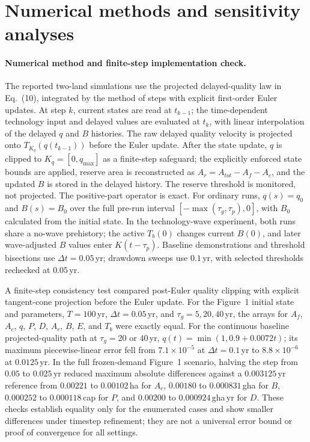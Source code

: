 \documentclass[11pt,a4paper]{article}
\begin{document}
\section{Numerical methods and sensitivity analyses}\label{si:numerics}

\paragraph{Numerical method and finite-step implementation check.} The reported two-land simulations use the projected delayed-quality law in Eq.~(10), integrated by the method of steps with explicit first-order Euler updates. At step $k$, current states are read at $t_{k-1}$; the time-dependent technology input and delayed values are evaluated at $t_k$, with linear interpolation of the delayed $q$ and $B$ histories. The raw delayed quality velocity is projected onto $T_{K_q}(q(t_{k-1}))$ before the Euler update. After the state update, $q$ is clipped to $K_q=[0,q_{\max}]$ as a finite-step safeguard; the explicitly enforced state bounds are applied, reserve area is reconstructed as $A_r=A_{tot}-A_f-A_c$, and the updated $B$ is stored in the delayed history. The reserve threshold is monitored, not projected. The positive-part operator is exact. For ordinary runs, $q(s)=q_0$ and $B(s)=B_0$ over the full pre-run interval $[-\max(\tau_g,\tau_p),0]$, with $B_0$ calculated from the initial state. In the technology-wave experiment, both runs share a no-wave prehistory; the active $T_b(0)$ changes current $B(0)$, and later wave-adjusted $B$ values enter $K(t-\tau_p)$. Baseline demonstrations and threshold bisections use $\Delta t=0.05$\,yr; drawdown sweeps use $0.1$\,yr, with selected thresholds rechecked at $0.05$\,yr.

A finite-step consistency test compared post-Euler quality clipping with explicit tangent-cone projection before the Euler update. For the Figure~1 initial state and parameters, $T=100$\,yr, $\Delta t=0.05$\,yr, and $\tau_g=5,20,40$\,yr, the arrays for $A_f$, $A_c$, $q$, $P$, $D$, $A_r$, $B$, $E$, and $T_b$ were exactly equal. For the continuous baseline projected-quality path at $\tau_g=20$ or $40$\,yr, $q(t)=\min(1,0.9+0.0072t)$; its maximum piecewise-linear error fell from $7.1\times10^{-5}$ at $\Delta t=0.1$\,yr to $8.8\times10^{-6}$ at $0.0125$\,yr. In the full frozen-demand Figure~1 scenario, halving the step from $0.05$ to $0.025$\,yr reduced maximum absolute differences against a $0.003125$\,yr reference from $0.00221$ to $0.00102$\,ha for $A_c$, $0.00180$ to $0.000831$\,gha for $B$, $0.000252$ to $0.000118$\,cap for $P$, and $0.00200$ to $0.000924$\,gha\,yr for $D$. These checks establish equality only for the enumerated cases and show smaller differences under timestep refinement; they are not a universal error bound or proof of convergence for all settings.
\end{document}
